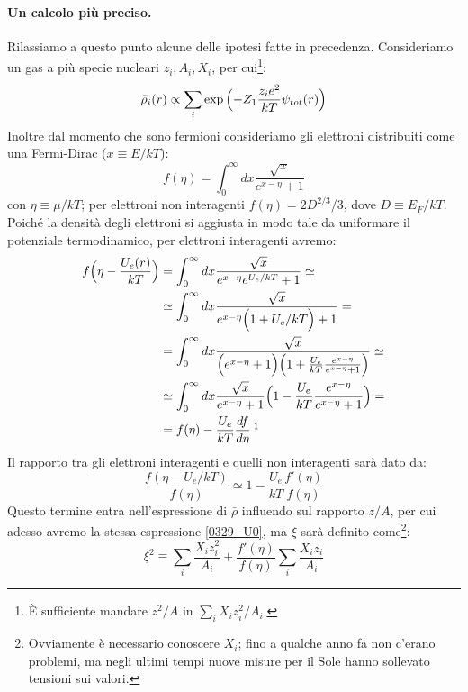\paragraph{Un calcolo più preciso.} Rilassiamo a questo punto alcune delle ipotesi fatte in precedenza. Consideriamo un gas a più specie nucleari $z_i, A_i, X_i$, per cui\footnote{È sufficiente mandare $z^2/A$ in $\sum_i X_iz^2_i/A_i$.}:
$$\bar{\rho}_i(r)\propto \sum_i \exp{\Bigl ( -Z_1 \frac{z_ie^2}{kT}\psi_{tot}(r) \Bigr )}$$
Inoltre dal momento che sono fermioni consideriamo gli elettroni distribuiti come una Fermi-Dirac ($x\equiv E/kT$):
$$f(\eta) = \int_0^\infty dx \frac{\sqrt{x}}{e^{x-\eta}+1}$$
con $\eta \equiv \mu/kT$; per elettroni non interagenti $f(\eta) = 2D^{2/3}/3$, dove $D\equiv E_F/kT$. Poiché la densità degli elettroni si aggiusta in modo tale da uniformare il potenziale termodinamico, per elettroni interagenti avremo:
\begin{displaymath}
\begin{aligned}
f\ppc{\eta - \frac{U_e(r)}{kT}} &= \int_0^\infty dx \frac{\sqrt{x}}{e^{x-\eta}e^{U_e/kT}+1} \simeq \\
&\simeq \int_0^\infty dx \frac{\sqrt{x}}{e^{x-\eta}\ppc{1+U_e/kT}+1} =\\
&= \int_0^\infty dx \frac{\sqrt{x}}{\ppc{e^{x-\eta}+1}\ppc{1+\frac{U_e}{kT}\frac{e^{x-\eta}}{e^{x-\eta}+1}}}\simeq \\
&\simeq \int_0^\infty dx \frac{\sqrt{x}}{e^{x-\eta}+1}\ppc{1-\frac{U_e}{kT}\frac{e^{x-\eta}}{e^{x-\eta}+1}} =\\
&= f(\eta) - \frac{U_e}{kT}\frac{df}{d\eta}\:\footnotemark
\end{aligned}
\end{displaymath}
\noindent Il rapporto tra gli elettroni interagenti e quelli non interagenti sarà dato da:
$$\frac{f(\eta-U_e/kT)}{f(\eta)} \simeq 1- \frac{U_e}{kT}\frac{f'(\eta)}{f(\eta)}$$
Questo termine entra nell'espressione di $\bar{\rho}$ influendo sul rapporto $z/A$, per cui adesso avremo la stessa espressione \eqref{0329_U0}, ma $\xi$ sarà definito come\footnote{Ovviamente è necessario conoscere $X_i$; fino a qualche anno fa non c'erano problemi, ma negli ultimi tempi nuove misure per il Sole hanno sollevato tensioni sui valori.}:
$$\xi^2 \equiv \sum_i\frac{X_iz_i^2}{A_i} + \frac{f'(\eta)}{f(\eta)}\sum_i\frac{X_iz_i}{A_i}$$


